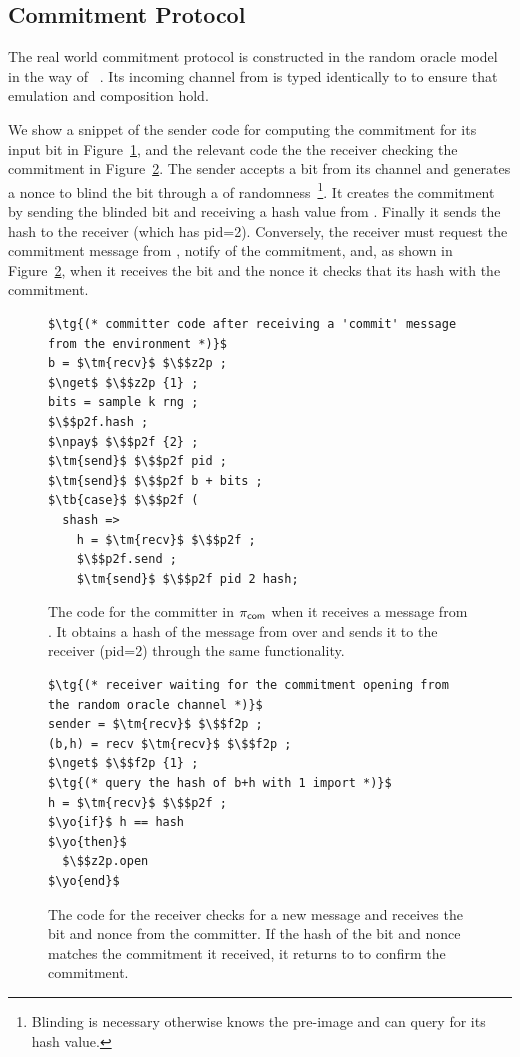 \subsection{Commitment Protocol}
The real world commitment protocol is constructed in the random oracle model in the way of ~\cite{hofheinzcommitment}.
Its incoming channel from \Z is typed identically to \Fcom to ensure that emulation and composition hold.

We show a snippet of the sender code for computing the commitment for its input bit in Figure~\ref{lst:committer}, and the relevant code the the receiver checking the commitment in Figure~\ref{lst:receiver}.
The sender accepts a bit from its  channel and generates a nonce to blind the bit through a  of randomness~\footnote{Blinding is necessary otherwise \A knows the pre-image and can query \Fro for its hash value.}.
It creates the commitment by sending \Fropp the blinded bit and receiving a hash value from .
Finally it sends the hash to the receiver (which has pid=2).
Conversely, the receiver must request the commitment  message from \Fropp, notify \Z of the commitment, and, as shown in Figure~\ref{lst:receiver}, when it receives the bit and the nonce it checks that its hash with the commitment.
\begin{figure}
\begin{lstlisting}[basicstyle=\footnotesize\BeraMonottFamily, frame=single, mathescape]
$\tg{(* committer code after receiving a 'commit' message from the environment *)}$
b = $\tm{recv}$ $\$$z2p ;
$\nget$ $\$$z2p {1} ;
bits = sample k rng ;
$\$$p2f.hash ;
$\npay$ $\$$p2f {2} ;
$\tm{send}$ $\$$p2f pid ;
$\tm{send}$ $\$$p2f b + bits ;
$\tb{case}$ $\$$p2f (
  shash => 
    h = $\tm{recv}$ $\$$p2f ;
    $\$$p2f.send ;
    $\tm{send}$ $\$$p2f pid 2 hash;
\end{lstlisting}
\caption{The code for the committer in $\pi_{{\mathsf {com}}}$ when it receives a  message from \Z. It obtains a hash of the message from \Fropp over  and sends it to the receiver (pid=2) through the same functionality.}
\label{lst:committer}
\vspace{-2mm}
\end{figure}
\begin{figure}
\begin{lstlisting}[basicstyle=\footnotesize\BeraMonottFamily, frame=single, mathescape]
$\tg{(* receiver waiting for the commitment opening from the random oracle channel *)}$
sender = $\tm{recv}$ $\$$f2p ;
(b,h) = recv $\tm{recv}$ $\$$f2p ;
$\nget$ $\$$f2p {1} ; 
$\tg{(* query the hash of b+h with 1 import *)}$
h = $\tm{recv}$ $\$$p2f ;
$\yo{if}$ h == hash
$\yo{then}$
  $\$$z2p.open
$\yo{end}$
\end{lstlisting}
\caption{The code for the receiver checks for a new message and receives the bit and nonce from the committer. If the hash of the bit and nonce matches the commitment it received, it returns  to \Z to confirm the commitment.}
\label{lst:receiver}
\vspace{-3mm}
\end{figure}

